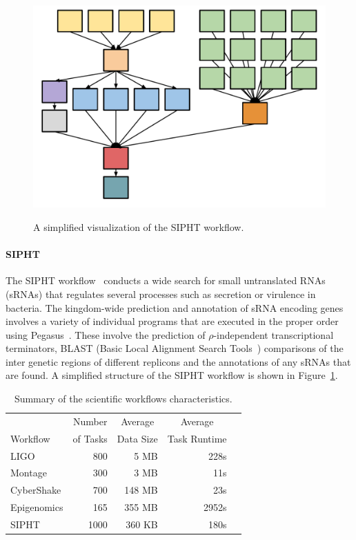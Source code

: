 \documentclass{IOS-Book-Article}
\begin{document}
\begin{figure}[htb]
	\centering
	\includegraphics[width=0.6\linewidth]{sipht_shape.pdf} \\
	\caption{A simplified visualization of the SIPHT workflow.}
	\label{fig:evaluation_shape_sipht}
\end{figure}

\paragraph{\textbf{SIPHT}}
The SIPHT workflow~\cite{SIPHT} conducts a wide search for small untranslated RNAs (sRNAs) that regulates several processes such as secretion or virulence in bacteria. The kingdom-wide prediction and annotation of sRNA encoding genes involves a variety of individual programs that are executed in the proper order using Pegasus~\cite{Deelman2004}. These involve the prediction of $\rho$-independent transcriptional terminators, BLAST (Basic Local Alignment Search Tools~\cite{BLAST}) comparisons of the inter genetic regions of different replicons and the annotations of any sRNAs that are found. A simplified structure of the SIPHT workflow is shown in Figure~\ref{fig:evaluation_shape_sipht}. 




\begin{table}[!htb]
	\setlength{\tabcolsep}{11pt}
	\centering
	\small
	\begin{tabular}{lrrrr}
		\hline
		 & \multicolumn{1}{c}{Number} & \multicolumn{1}{c}{Average} &  \multicolumn{1}{c}{Average} \\
		Workflow	& of Tasks	 & Data Size & Task Runtime \\
		\hline
		LIGO 		&800		& 5 MB	& 228s\\
		Montage 		&300		&3 MB	&11s\\
		CyberShake 	&700		&148 MB 	& 23s\\
		Epigenomics 	&165 	& 355 MB	& 2952s\\
		SIPHT		&1000	& 360 KB 	& 180s\\
		\hline
	\end{tabular}
	\caption{Summary of the scientific workflows characteristics.}
	\label{tab:evaluation_workflows}
\end{table} 
\end{document}
